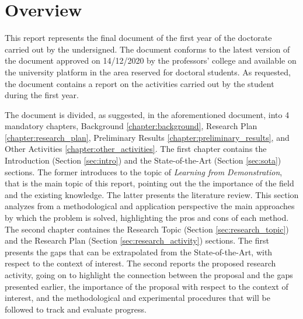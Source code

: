 \clearpage
\chapter*{Overview}\label{chapter:overview}

This report represents the final document of the first year of the doctorate carried out by the undersigned. The document conforms to the latest version of the document \hyperlink{https://corsi.unisa.it/ingegneria-dell-informazione/didattica/guida-dello-studente}{\textit{}} approved on 14/12/2020 by the professors' college and available on the university platform in the area reserved for doctoral students. As requested, the document contains a report on the activities carried out by the student during the first year. \par
The document is divided, as suggested, in the aforementioned document, into 4 mandatory chapters, Background \ref{chapter:background}, Research Plan \ref{chapter:research_plan}, Preliminary Results \ref{chapter:preliminary_results}, and Other Activities \ref{chapter:other_activities}.
\newline The first chapter contains the Introduction (Section \ref{sec:intro}) and the State-of-the-Art (Section \ref{sec:sota}) sections. The former introduces to the topic of \textit{Learning from Demonstration}, that is the main topic of this report, pointing out the the importance of the field and the existing knowledge. The latter presents the literature review. This section analyzes from a methodological and application perspective the main approaches by which the problem is solved, highlighting the pros and cons of each method.
\newline The second chapter containes the Research Topic (Section \ref{sec:research_topic}) and the Research Plan (Section \ref{sec:research_activity}) sections. The first presents the gaps that can be extrapolated from the State-of-the-Art, with respect to the context of interest. The second reports the proposed research activity, going on to highlight the connection between the proposal and the gaps presented earlier, the importance of the proposal with respect to the context of interest, and the methodological and experimental procedures that will be followed to track and evaluate progress.

